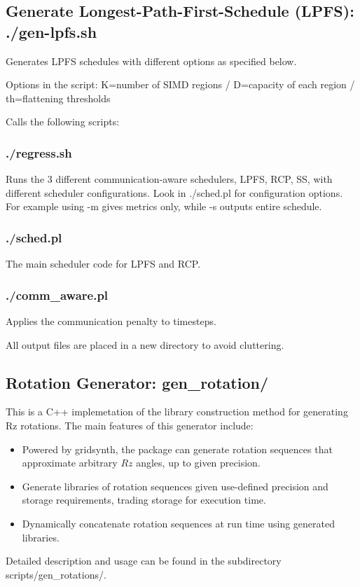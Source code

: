 \subsection{Generate Longest-Path-First-Schedule (LPFS): ./gen-lpfs.sh}
Generates LPFS schedules with different options as specified below.

Options in the script: 
  K=number of SIMD regions / D=capacity of each region / th=flattening thresholds

Calls the following scripts:
  
  \subsubsection{./regress.sh}
  
  Runs the 3 different communication-aware schedulers, LPFS, RCP, SS, with different scheduler configurations.
  Look in ./sched.pl for configuration options. For example using -m gives metrics only, while -s outputs entire schedule.

  \subsubsection{./sched.pl}
  The main scheduler code for LPFS and RCP.

  \subsubsection{./comm\_aware.pl}
  Applies the communication penalty to timesteps.

All output files are placed in a new directory to avoid cluttering.

\subsection{Rotation Generator: gen\_rotation/}

This is a C++ implemetation of the library construction method for generating Rz rotations. The main features of this generator include: 
\begin{itemize}
\item Powered by gridsynth, the package can generate rotation sequences that approximate arbitrary $Rz$ angles, up to given precision. 
\item Generate libraries of rotation sequences given use-defined precision and storage requirements, trading storage for execution time. 
\item Dynamically concatenate rotation sequences at run time using generated libraries.
\end{itemize}
Detailed description and usage can be found in the subdirectory scripts/gen\_rotations/.


